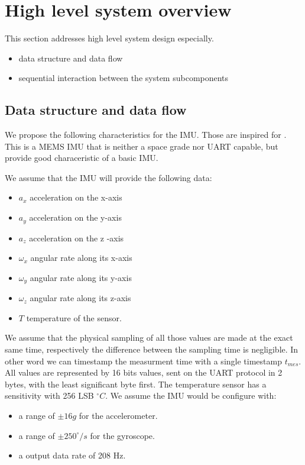 \section{High level system overview}
This section addresses high level system design especially.
\begin{itemize}
    \item data structure and data flow
    \item sequential interaction between the system subcomponents
\end{itemize}

\subsection{Data structure and data flow}
We propose the following characteristics for the IMU. Those are inspired for \cite{lm6ds3}. This is a MEMS IMU that is neither a space grade nor UART capable, but provide good characeristic of a basic IMU.

We assume that the IMU will provide the following data:
\begin{itemize}
    \item $a_x$ acceleration on the x-axis
    \item $a_y$ acceleration on the y-axis
    \item $a_z$ acceleration on the z -axis
    \item $\omega_x$ angular rate along its x-axis
    \item $\omega_y$ angular rate along its y-axis
    \item $\omega_z$ angular rate along its z-axis
    \item $T$ temperature of the sensor.
\end{itemize}
We assume that the physical sampling of all those values are made at the exact same time, respectively the difference between the sampling time is negligible.
In other word we can timestamp the measurment time with a single timestamp $t_{mes}$.
All values are represented by 16 bits values, sent on the UART protocol in 2 bytes, with the least significant byte first.
The temperature sensor has a sensitivity with 256 LSB $^{\circ}C$.
We assume the IMU would be configure with:
\begin{itemize}
    \item a range of $\pm 16g$ for the accelerometer.
    \item a range of $\pm 250^{\circ}/s$ for the gyroscope.
    \item a output data rate of 208 Hz.
\end{itemize}

